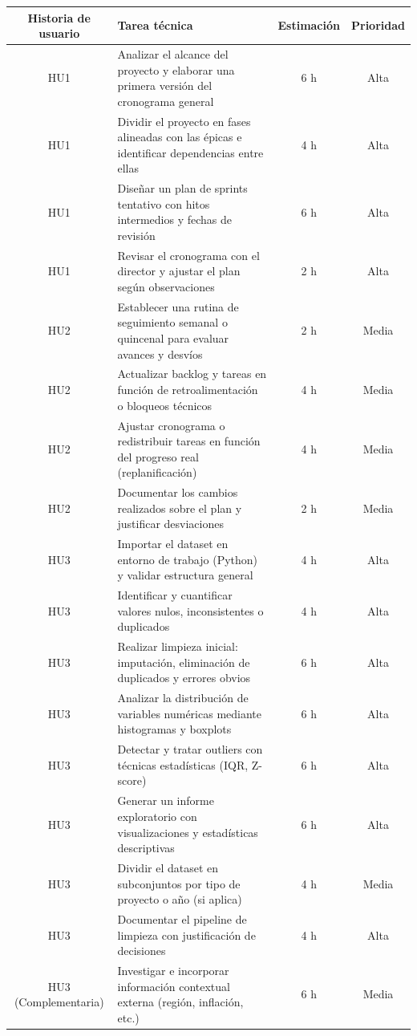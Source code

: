 \documentclass[
11pt, %
]{charter}
\begin{document}
\begin{table}[htpb]
\centering
\begin{tabularx}{\linewidth}{@{}|c|X|c|c|@{}}
\hline
\rowcolor[HTML]{C0C0C0}
Historia de usuario & Tarea técnica & Estimación & Prioridad \\ \hline

HU1 & Analizar el alcance del proyecto y elaborar una primera versión del cronograma general & 6 h & Alta \\ \hline
HU1 & Dividir el proyecto en fases alineadas con las épicas e identificar dependencias entre ellas & 4 h & Alta \\ \hline
HU1 & Diseñar un plan de sprints tentativo con hitos intermedios y fechas de revisión & 6 h & Alta \\ \hline
HU1 & Revisar el cronograma con el director y ajustar el plan según observaciones & 2 h & Alta \\ \hline

HU2 & Establecer una rutina de seguimiento semanal o quincenal para evaluar avances y desvíos & 2 h & Media \\ \hline
HU2 & Actualizar backlog y tareas en función de retroalimentación o bloqueos técnicos & 4 h & Media \\ \hline
HU2 & Ajustar cronograma o redistribuir tareas en función del progreso real (replanificación) & 4 h & Media \\ \hline
HU2 & Documentar los cambios realizados sobre el plan y justificar desviaciones & 2 h & Media \\ \hline

HU3 & Importar el dataset en entorno de trabajo (Python) y validar estructura general & 4 h & Alta \\ \hline
HU3 & Identificar y cuantificar valores nulos, inconsistentes o duplicados & 4 h & Alta \\ \hline
HU3 & Realizar limpieza inicial: imputación, eliminación de duplicados y errores obvios & 6 h & Alta \\ \hline
HU3 & Analizar la distribución de variables numéricas mediante histogramas y boxplots & 6 h & Alta \\ \hline
HU3 & Detectar y tratar outliers con técnicas estadísticas (IQR, Z-score) & 6 h & Alta \\ \hline
HU3 & Generar un informe exploratorio con visualizaciones y estadísticas descriptivas & 6 h & Alta \\ \hline
HU3 & Dividir el dataset en subconjuntos por tipo de proyecto o año (si aplica) & 4 h & Media \\ \hline
HU3 & Documentar el pipeline de limpieza con justificación de decisiones & 4 h & Alta \\ \hline
HU3 (Complementaria) & Investigar e incorporar información contextual externa (región, inflación, etc.) & 6 h & Media \\ \hline

\end{tabularx}
\end{table}
\end{document}
